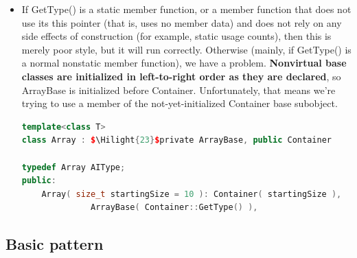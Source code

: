 \documentclass[a4paper,11pt,twoside]{book}
\newcommand{\Hilight}[1]{\makebox[0pt][l]{\color{yellow}\rule[-3pt]{#1em}{11pt}}}
\newcommand{\Hilight}[1]{}
\begin{document}
\begin{itemize}
\item If GetType() is a static member function, or a member function that does not use its this pointer (that is, uses no member data) and does not rely on any side effects of construction (for example, static usage counts), then this is merely poor style, but it will run correctly. Otherwise (mainly, if GetType() is a normal nonstatic member function), we have a problem.
\textbf{Nonvirtual base classes are initialized in left-to-right order as they are declared}, so ArrayBase
is initialized before Container. Unfortunately, that means we're trying to use a member of the
not-yet-initialized Container base subobject.

\begin{lstlisting}[frame=single, language=c++, mathescape=true]
template<class T>
class Array : $\Hilight{23}$private ArrayBase, public Container

typedef Array AIType;
public:
	Array( size_t startingSize = 10 ): Container( startingSize ), 
	          ArrayBase( Container::GetType() ),
\end{lstlisting}

\end{itemize}

\subsection{Basic pattern}
\end{document}
